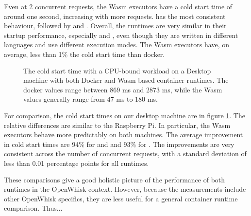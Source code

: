 Even at 2 concurrent requests, the Wasm executors have a cold start time of around one second, increasing with more requests.  has the most consistent behaviour, followed by  and . Overall, the runtimes are very similar in their startup performance, especially  and , even though they are written in different languages and use different execution modes. The Wasm executors have, on average, less than 1\% the cold start time than docker.


\begin{figure}
    \begin{center}
        
    \end{center}
    \caption{The cold start time with a CPU-bound workload on a Desktop machine with both Docker and Wasm-based container runtimes. The docker values range between 869 ms and 2873 ms, while the Wasm values generally range from 47 ms to 180 ms.}
    \label{fig:pc-cold-start-hash}
\end{figure}

For comparison, the cold start times on our  desktop machine are in figure \ref{fig:pc-cold-start-hash}. The relative differences are similar to the Raspberry Pi. In particular, the Wasm executors behave more predictably on both machines. The average improvement in cold start times are 94\% for  and  and 93\% for . The improvements are very consistent across the number of concurrent requests, with a standard deviation of less than 0.01 percentage points for all runtimes.

These comparisons give a good holistic picture of the performance of both runtimes in the OpenWhisk context. However, because the measurements include other OpenWhisk specifics, they are less useful for a general container runtime comparison. Thus...


